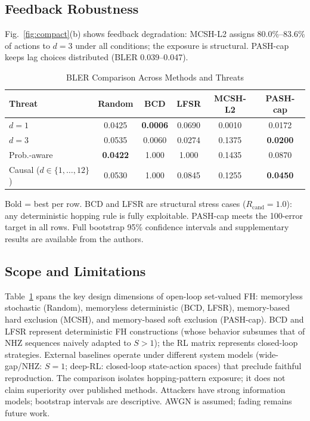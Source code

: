 \documentclass[letterpaper,journal,10pt]{IEEEtran}
\begin{document}
\subsection{Feedback Robustness}
Fig.~\ref{fig:compact}(b) shows feedback degradation: MCSH-L2 assigns
80.0\%--83.6\% of actions to $d=3$ under all conditions; the exposure is
structural. PASH-cap keeps lag choices distributed (BLER 0.039--0.047).

\begin{table}[!t]
\centering
\caption{BLER Comparison Across Methods and Threats}
\label{tab:bler}
\footnotesize
\setlength{\tabcolsep}{4.2pt}
\begin{tabular}{lccccc}
\toprule
Threat & Random & BCD & LFSR & MCSH-L2 & PASH-cap \\
\midrule
$d{=}1$  & 0.0425 & \textbf{0.0006} & 0.0690 & 0.0010 & 0.0172 \\
$d{=}3$  & 0.0535 & 0.0060 & 0.0274 & 0.1375 & \textbf{0.0200} \\
Prob.-aware & \textbf{0.0422} & 1.000 & 1.000 & 0.1435 & 0.0870 \\
Causal ($d{\in}\{1,\ldots,12\}$) & 0.0530 & 1.000 & 0.0845 & 0.1255 & \textbf{0.0450} \\
\bottomrule
\end{tabular}

\vspace{3pt}
{\footnotesize Bold = best per row. BCD and LFSR are structural stress cases
($R_{\mathrm{cand}}{=}1.0$): any deterministic hopping rule is fully
exploitable. PASH-cap meets the 100-error target in all rows. Full bootstrap
95\% confidence intervals and supplementary results are available from the
authors.}
\end{table}

\subsection{Scope and Limitations}
Table~\ref{tab:bler} spans the key design dimensions of open-loop
set-valued FH: memoryless stochastic (Random), memoryless deterministic
(BCD, LFSR), memory-based hard exclusion (MCSH), and memory-based soft
exclusion (PASH-cap). BCD and LFSR represent deterministic FH constructions
(whose behavior subsumes that of NHZ sequences naively adapted to
$S{>}1$); the RL matrix represents
closed-loop strategies. External baselines operate under different system
models (wide-gap/NHZ: $S{=}1$; deep-RL: closed-loop state-action spaces)
that preclude faithful reproduction. The comparison isolates
hopping-pattern exposure; it does not claim superiority over published
methods. Attackers have strong information models; bootstrap intervals are
descriptive. AWGN is assumed; fading remains future work.
\end{document}
